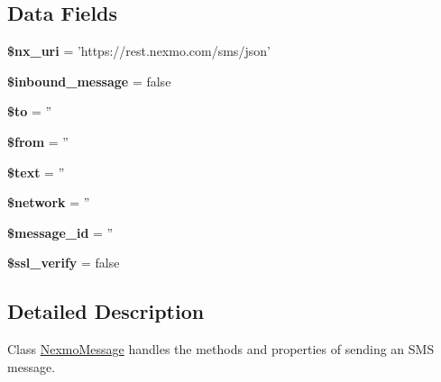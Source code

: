 \subsection*{Data Fields}
\begin{DoxyCompactItemize}
\item 
\hypertarget{class_nexmo_message_af0f09cbe026631e5bc05ef4d66c357f9}{{\bfseries \$nx\-\_\-uri} = 'https\-://rest.\-nexmo.\-com/sms/json'}\label{class_nexmo_message_af0f09cbe026631e5bc05ef4d66c357f9}

\item 
\hypertarget{class_nexmo_message_a910225fcba72e3e8602ad13b23fcc5dc}{{\bfseries \$inbound\-\_\-message} = false}\label{class_nexmo_message_a910225fcba72e3e8602ad13b23fcc5dc}

\item 
\hypertarget{class_nexmo_message_ac19f839b525d6d99d063fe56bf2a6d3b}{{\bfseries \$to} = ''}\label{class_nexmo_message_ac19f839b525d6d99d063fe56bf2a6d3b}

\item 
\hypertarget{class_nexmo_message_a0bb7e2b3d541598cc9c9e3b11bee859c}{{\bfseries \$from} = ''}\label{class_nexmo_message_a0bb7e2b3d541598cc9c9e3b11bee859c}

\item 
\hypertarget{class_nexmo_message_adf95f30eaafccead90ab5e2cdb55e9b9}{{\bfseries \$text} = ''}\label{class_nexmo_message_adf95f30eaafccead90ab5e2cdb55e9b9}

\item 
\hypertarget{class_nexmo_message_ae4ae20f4cdfc7cd4445756bf74c289dc}{{\bfseries \$network} = ''}\label{class_nexmo_message_ae4ae20f4cdfc7cd4445756bf74c289dc}

\item 
\hypertarget{class_nexmo_message_ab658319503f3b25fb0f3dadac3ce00d4}{{\bfseries \$message\-\_\-id} = ''}\label{class_nexmo_message_ab658319503f3b25fb0f3dadac3ce00d4}

\item 
\hypertarget{class_nexmo_message_a2d6c91b6095163eae650dc785087a7ba}{{\bfseries \$ssl\-\_\-verify} = false}\label{class_nexmo_message_a2d6c91b6095163eae650dc785087a7ba}

\end{DoxyCompactItemize}


\subsection{Detailed Description}
Class \hyperlink{class_nexmo_message}{Nexmo\-Message} handles the methods and properties of sending an S\-M\-S message.

